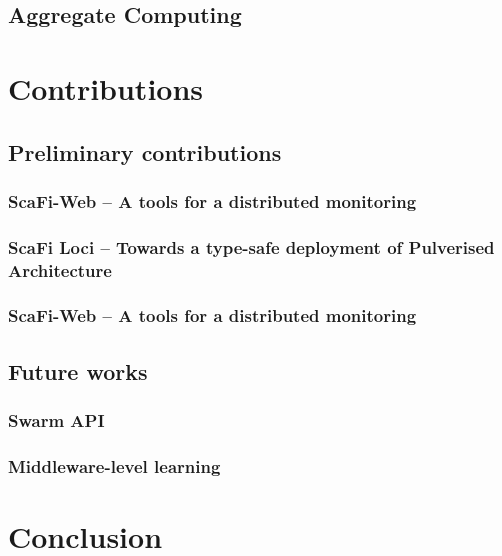 \documentclass[11pt]{article}
\begin{document}
\subsection{Aggregate Computing}
\section{Contributions}

\subsection{Preliminary contributions}
\subsubsection{ScaFi-Web -- A tools for a distributed monitoring}
\subsubsection{ScaFi Loci -- Towards a type-safe deployment of Pulverised Architecture}
\subsubsection{ScaFi-Web -- A tools for a distributed monitoring}
\subsection{Future works}
\subsubsection{Swarm API}
\subsubsection{Middleware-level learning}
\section{Conclusion}
\nocite{*}


\end{document}

